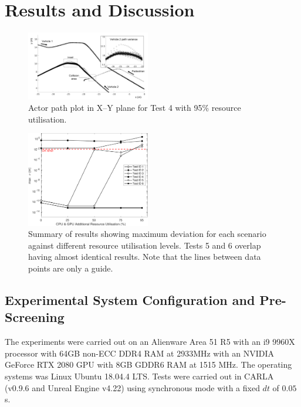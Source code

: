 \section{Results and Discussion}\label{s:FinalResultsSection}
\begin{figure}[t]
    \centering
    \includegraphics[width=0.48\textwidth]{../other/figures/actor_path_plot.jpg}
    \caption{Actor path plot in X--Y plane for Test 4 with 95\% resource utilisation.}
    \label{actorPathPlot}
\end{figure}

\begin{figure}[t]
    \centering
    \includegraphics[width=0.48\textwidth]{../other/figures/ExperimentsStressSummaryV6.pdf}
    \caption{Summary of results showing maximum deviation for each scenario against different resource utilisation levels. Tests 5 and 6 overlap having almost identical results. Note that the lines between data points are only a guide.}
    \label{ExperimentsStressSummary}
\end{figure}
  
\subsection{Experimental System Configuration and Pre-Screening}\label{s:screening}
The experiments were carried out on an Alienware Area 51 R5 with an i9 9960X processor with 64GB non-ECC DDR4 RAM at 2933MHz with an NVIDIA GeForce RTX 2080 GPU with 8GB GDDR6 RAM at 1515 MHz. The operating systems was Linux Ubuntu 18.04.4 LTS. Tests were carried out in CARLA (v0.9.6 and Unreal Engine v4.22) using synchronous mode with a fixed $dt$ of $0.05$s. 

